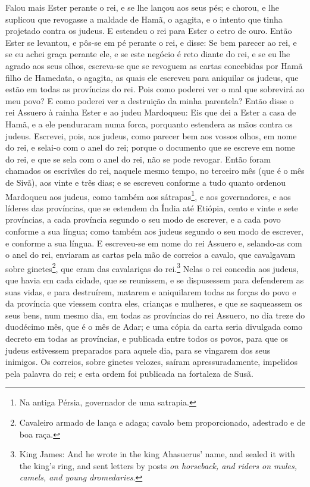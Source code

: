 Falou mais Ester perante o rei, e se lhe lançou aos seus pés; e
chorou, e lhe suplicou que revogasse a maldade de Hamã, o agagita, e
o intento que tinha projetado contra os judeus. E estendeu o rei
para Ester o cetro de ouro. Então Ester se levantou, e pôs-se em pé
perante o rei, e disse: Se bem parecer ao rei, e se eu achei
graça perante ele, e se este negócio é reto diante do rei, e se eu
lhe agrado aos seus olhos, escreva-se que se revoguem as cartas
concebidas por Hamã filho de Hamedata, o agagita, as quais ele
escreveu para aniquilar os judeus, que estão em todas as províncias
do rei. Pois como poderei ver o mal que sobrevirá ao meu povo? E
como poderei ver a destruição da minha parentela? Então disse o
rei Assuero à rainha Ester e ao judeu Mardoqueu: Eis que dei a Ester
a casa de Hamã, e a ele penduraram numa forca, porquanto estendera
as mãos contra os judeus. Escrevei, pois, aos judeus, como
parecer bem aos vossos olhos, em nome do rei, e selai-o com o anel
do rei; porque o documento que se escreve em nome do rei, e que se
sela com o anel do rei, não se pode revogar. Então foram
chamados os escrivães do rei, naquele mesmo tempo, no terceiro mês
(que é o mês de Sivã), aos vinte e três dias; e se escreveu conforme
a tudo quanto ordenou Mardoqueu aos judeus, como também aos
sátrapas\footnote{Na antiga Pérsia, governador de uma satrapia.}, e
aos governadores, e aos líderes das províncias, que se estendem da
Índia até Etiópia, cento e vinte e sete províncias, a cada província
segundo o seu modo de escrever, e a cada povo conforme a sua língua;
como também aos judeus segundo o seu modo de escrever, e conforme a
sua língua. E escreveu-se em nome do rei Assuero e,
selando-as com o anel do rei, enviaram as cartas pela mão de
correios a cavalo, que cavalgavam sobre ginetes\footnote{Cavaleiro
armado de lança e adaga; cavalo bem proporcionado, adestrado e de
boa raça.}, que eram das cavalariças do rei.\footnote{King James:
And he wrote in the king Ahasuerus' name, and sealed it with the
king's ring, and sent letters by posts \emph{on horseback, and
riders on mules, camels, and young dromedaries}.} Nelas o rei
concedia aos judeus, que havia em cada cidade, que se reunissem, e
se dispusessem para defenderem as suas vidas, e para destruírem,
matarem e aniquilarem todas as forças do povo e da província que
viessem contra eles, crianças e mulheres, e que se saqueassem os
seus bens, num mesmo dia, em todas as províncias do rei
Assuero, no dia treze do duodécimo mês, que é o mês de Adar;
e uma cópia da carta seria divulgada como decreto em todas as
províncias, e publicada entre todos os povos, para que os judeus
estivessem preparados para aquele dia, para se vingarem dos seus
inimigos. Os correios, sobre ginetes velozes, saíram
apressuradamente, impelidos pela palavra do rei; e esta ordem foi
publicada na fortaleza de Susã.

